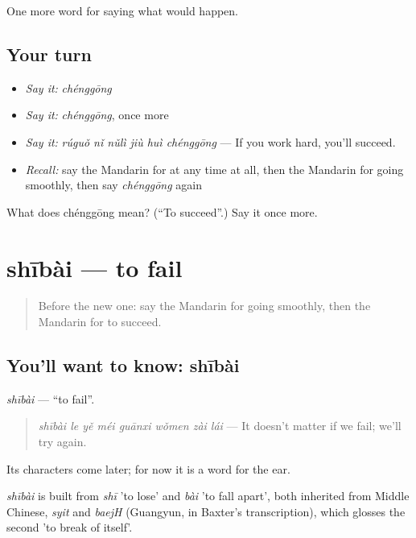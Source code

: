 \begin{grammarlens}[title={What you've built}]
One more word for saying what would happen.
\end{grammarlens}

\subsection*{Your turn}
\begin{itemize}
\raggedright
  \item \emph{Say it:} \emph{chénggōng}
  \item \emph{Say it:} \emph{chénggōng}, once more
  \item \emph{Say it:} \emph{rúguǒ nǐ nǔlì jiù huì chénggōng} — If you work hard, you'll succeed.
  \item \emph{Recall:} say the Mandarin for at any time at all, then the Mandarin for going smoothly, then say \emph{chénggōng} again
\end{itemize}

\begin{tcolorbox}[breakable,colback=teal!4,colframe=teal!35!black,title={Before you move on}]
What does chénggōng mean? (\textquotedblleft{}To succeed\textquotedblright{}.) Say it once more.
\end{tcolorbox}
\section[shībài]{shībài — to fail}

\label{lesson:ZH-C394-shibai}



\begin{quote}
Before the new one: say the Mandarin for going smoothly, then the Mandarin for to succeed.
\end{quote}

\subsection*{You'll want to know: shībài}
\emph{shībài} — \textquotedblleft{}to fail\textquotedblright{}.

\begin{quote}
\emph{shībài le yě méi guānxi wǒmen zài lái} — It doesn't matter if we fail; we'll try again.
\end{quote}

Its characters come later; for now it is a word for the ear.

\begin{cousinweb}
\emph{shībài} is built from \emph{shī} 'to lose' and \emph{bài} 'to fall apart', both inherited from Middle Chinese, \emph{syit} and \emph{baejH} (Guangyun, in Baxter's transcription), which glosses the second 'to break of itself'.
\end{cousinweb}

